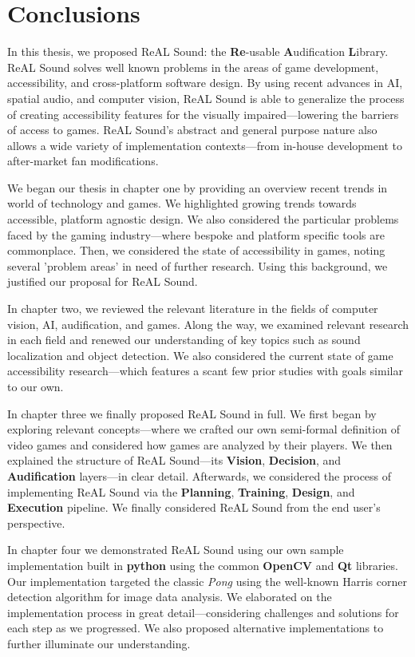 \documentclass{report}
\newcommand{\rs}{ReAL Sound\xspace}
\newcommand{\rsfull}{\textbf{Re}-usable \textbf{A}udification \textbf{L}ibrary\xspace}
\newcommand{\plan}{\textbf{Planning}\xspace}
\newcommand{\train}{\textbf{Training}\xspace}
\newcommand{\design}{\textbf{Design}\xspace}
\newcommand{\exec}{\textbf{Execution}\xspace}
\newcommand{\vision}{\textbf{Vision}\xspace}
\newcommand{\decision}{\textbf{Decision}\xspace}
\newcommand{\audio}{\textbf{Audification}\xspace}
\newcommand{\tech}[1]{\textbf{#1}}
\begin{document}
\chapter{Conclusions}
In this thesis, we proposed \rs: the \rsfull. \rs solves well known problems in the areas of game development, accessibility, and cross-platform software design. By using recent advances in AI, spatial audio, and computer vision, \rs is able to generalize the process of creating accessibility features for the visually impaired---lowering the barriers of access to games. \rs's abstract and general purpose nature also allows a wide variety of implementation contexts---from in-house development to after-market fan modifications.

We began our thesis in chapter one by providing an overview recent trends in world of technology and games. We highlighted growing trends towards accessible, platform agnostic design. We also considered the particular problems faced by the gaming industry---where bespoke and platform specific tools are commonplace. Then, we considered the state of accessibility in games, noting several 'problem areas' in need of further research. Using this background, we justified our proposal for \rs. 

In chapter two, we reviewed the relevant literature in the fields of computer vision, AI, audification, and games. Along the way, we examined relevant research in each field and renewed our understanding of key topics such as sound localization and object detection. We also considered the current state of game accessibility research---which features a scant few prior studies with goals similar to our own.

In chapter three we finally proposed \rs in full. We first began by exploring relevant concepts---where we crafted our own semi-formal definition of video games and considered how games are analyzed by their players. We then explained the structure of \rs---its \vision, \decision, and \audio layers---in clear detail. Afterwards, we considered the process of implementing \rs via the \plan, \train, \design, and \exec pipeline. We finally considered \rs from the end user's perspective.

In chapter four we demonstrated \rs using our own sample implementation built in \tech{python} using the common \tech{OpenCV} and \tech{Qt} libraries. Our implementation targeted the classic \emph{Pong} using the well-known Harris corner detection algorithm for image data analysis. We elaborated on the implementation process in great detail---considering challenges and solutions for each step as we progressed. We also proposed alternative implementations to further illuminate our understanding.
\end{document}
